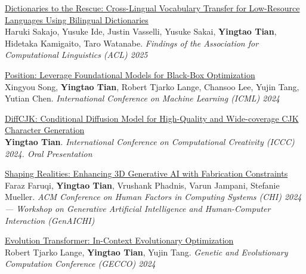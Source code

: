 \documentclass[line,margin]{cv}
\begin{document}
\begin{resume}
{  \begin{samepage}
  \href{https://aclanthology.org/2025.findings-acl.1333/}{Dictionaries to the Rescue: Cross-Lingual Vocabulary Transfer for Low-Resource Languages Using Bilingual Dictionaries}\\
  Haruki Sakajo, Yusuke Ide, Justin Vasselli, Yusuke Sakai, \textbf{Yingtao Tian}, Hidetaka Kamigaito, Taro Watanabe. \emph{Findings of the Association for Computational Linguistics (ACL) 2025}
  \par\end{samepage}

  \begin{samepage}
  \href{https://proceedings.mlr.press/v235/song24h.html}{Position: Leverage Foundational Models for Black-Box Optimization}\\
  Xingyou Song, \textbf{Yingtao Tian}, Robert Tjarko Lange, Chansoo Lee, Yujin Tang, Yutian Chen. \emph{International Conference on Machine Learning (ICML) 2024}
  \par\end{samepage}

  \begin{samepage}
  \href{https://arxiv.org/abs/2404.05212}{DiffCJK: Conditional Diffusion Model for High-Quality and Wide-coverage CJK Character Generation}\\
  \textbf{Yingtao Tian}. \emph{International Conference on Computational Creativity (ICCC) 2024. Oral Presentation}
  \par\end{samepage}

  \begin{samepage}
  \href{https://arxiv.org/abs/2404.10142}{Shaping Realities: Enhancing 3D Generative AI with Fabrication Constraints}\\
  Faraz Faruqi, \textbf{Yingtao Tian}, Vrushank Phadnis, Varun Jampani, Stefanie Mueller. \emph{ACM Conference on Human Factors in Computing Systems (CHI) 2024 --- Workshop on Generative Artificial Intelligence and Human-Computer Interaction (GenAICHI)}
  \par\end{samepage}

  \begin{samepage}
  \href{https://arxiv.org/abs/2403.02985}{Evolution Transformer: In-Context Evolutionary Optimization}\\
  Robert Tjarko Lange, \textbf{Yingtao Tian}, Yujin Tang. \emph{Genetic and Evolutionary Computation Conference (GECCO) 2024}
  \par\end{samepage}

}
\end{resume}
\end{document}
